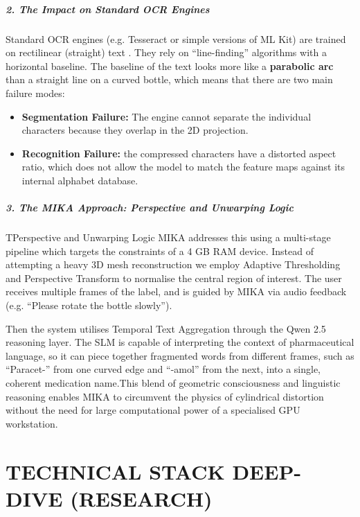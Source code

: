 \documentclass[12pt,a4paper]{report}
\begin{document}
\paragraph{2. The Impact on Standard OCR Engines} Standard OCR engines (e.g. Tesseract or simple versions of ML Kit) are trained on rectilinear (straight) text . They rely on “line-finding” algorithms with a horizontal baseline. The baseline of the text looks more like a \textbf{parabolic arc} than a straight line on a curved bottle, which means that there are two main failure modes:
\begin{itemize}
    \item \textbf{Segmentation Failure:} The engine cannot separate the individual characters because they overlap in the 2D projection.
    \item \textbf{Recognition Failure:} the compressed characters have a distorted aspect ratio, which does not allow the model to match the feature maps against its internal alphabet database.
\end{itemize}
 
\paragraph{3. The MIKA Approach: Perspective and Unwarping Logic}
TPerspective and Unwarping Logic MIKA addresses this using a multi-stage pipeline which targets the constraints of a 4 GB RAM device. Instead of attempting a heavy 3D mesh reconstruction we employ Adaptive Thresholding and Perspective Transform to normalise the central region of interest. The user receives multiple frames of the label, and is guided by MIKA via audio feedback (e.g. “Please rotate the bottle slowly”).
 
\noindent Then the system utilises Temporal Text Aggregation through the Qwen 2.5 reasoning layer. The SLM is capable of interpreting the context of pharmaceutical language, so it can piece together fragmented words from different frames, such as “Paracet-” from one curved edge and “-amol” from the next, into a single, coherent medication name.This blend of geometric consciousness and linguistic reasoning enables MIKA to circumvent the physics of cylindrical distortion without the need for large computational power of a specialised GPU workstation.
 
\chapter{TECHNICAL STACK DEEP-DIVE (RESEARCH)}
 
\end{document}

